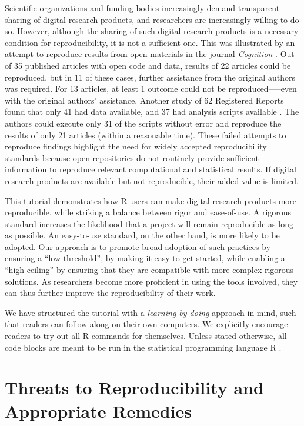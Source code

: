 \documentclass[psych,tutorial,submit,moreauthors,pdftex]{mdpi}
\begin{document}
Scientific organizations and funding bodies increasingly demand
transparent sharing of digital research products, and researchers are
increasingly willing to do so. However, although the sharing of such
digital research products is a necessary condition for reproducibility,
it is not a sufficient one. This was illustrated by an attempt to
reproduce results from open materials in the journal \emph{Cognition}
\citep{hardwicke2018}. Out of 35 published articles with open code and
data, results of 22 articles could be reproduced, but in 11 of these
cases, further assistance from the original authors was required. For 13
articles, at least 1 outcome could not be reproduced-----even with the
original authors' assistance. Another study of 62 Registered Reports
found that only 41 had data available, and 37 had analysis scripts
available \citep{obels2020}. The authors could execute only 31 of the
scripts without error and reproduce the results of only 21 articles
(within a reasonable time). These failed attempts to reproduce findings
highlight the need for widely accepted reproducibility standards because
open repositories do not routinely provide sufficient information to
reproduce relevant computational and statistical results. If digital
research products are available but not reproducible, their added value
is limited.

This tutorial demonstrates how R users can make digital research
products more reproducible, while striking a balance between rigor and
ease-of-use. A rigorous standard increases the likelihood that a project
will remain reproducible as long as possible. An easy-to-use standard,
on the other hand, is more likely to be adopted. Our approach is to
promote broad adoption of such practices by ensuring a ``low
threshold'', by making it easy to get started, while enabling a ``high
ceiling'' by ensuring that they are compatible with more complex
rigorous solutions. As researchers become more proficient in using the
tools involved, they can thus further improve the reproducibility of
their work.

We have structured the tutorial with a \emph{learning-by-doing} approach
in mind, such that readers can follow along on their own computers. We
explicitly encourage readers to try out all R commands for themselves.
Unless stated otherwise, all code blocks are meant to be run in the
statistical programming language R \citep[tested with version
4.0.4]{R-base}.

\hypertarget{threats-to-reproducibility-and-appropriate-remedies}{%
\section{Threats to Reproducibility and Appropriate
Remedies}\label{threats-to-reproducibility-and-appropriate-remedies}}
\end{document}
